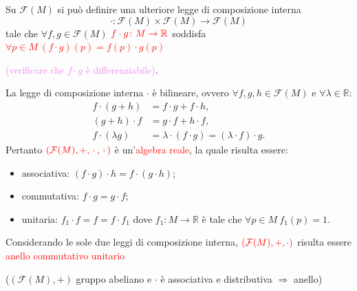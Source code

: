         Su $\mathcal{F}(M)$ si può definire una ulteriore legge di composizione interna
        \[
        \boldsymbol{\cdot} \colon \mathcal{F}(M) \times \mathcal{F}(M) \to \mathcal{F}(M)
        \]
        tale che $\forall f, g \in \mathcal{F}(M)$ $\textcolor{red}{f \cdot g \colon M \to \mathbb{R}}$ soddisfa \textcolor{red}{$\forall p \in M \ (f \cdot g)(p) = f(p) \cdot g(p)$} 
        
        \textcolor{violet}{(verificare che $f \cdot g$ è differenziabile)}.

        La legge di composizione interna $\cdot$ è bilineare, ovvero $\forall f, g, h \in \mathcal{F}(M)$ e $\forall \lambda \in \mathbb{R}$:
        \begin{align*}
        f \cdot (g + h) &= f \cdot g + f \cdot h, \\
        (g + h) \cdot f &= g \cdot f + h \cdot f, \\
        f \cdot (\lambda g) &= \lambda \cdot (f \cdot g) = (\lambda \cdot f) \cdot g.
        \end{align*}
        Pertanto $\textcolor{red}{(\mathcal{F}(M), +, \, \cdot \, , \, \cdot \,)}$ è un'\textcolor{red}{algebra reale}, la quale risulta essere:
        \begin{itemize}
            \item \textcolor{blu}{associativa}: $(f \cdot g) \cdot h = f \cdot (g \cdot h)$;
            \item \textcolor{blu}{commutativa}: $f \cdot g = g \cdot f$;
            \item \textcolor{blu}{unitaria}: $f_1 \cdot f = f = f \cdot f_1$ dove $f_1 \colon M \to \mathbb{R}$ è tale che $\forall p \in M \ f_1(p) = 1$.
        \end{itemize}

        Considerando le sole due leggi di composizione interna,
        $\textcolor{red}{(\mathcal{F}(M), +, \cdot)}$ risulta essere \textcolor{red}{anello commutativo unitario} 
        
        \textcolor{blu}{($(\mathcal{F}(M), +)$ gruppo abeliano e $\boldsymbol{\cdot}$ è associativa e distributiva $\Rightarrow$ anello)}
